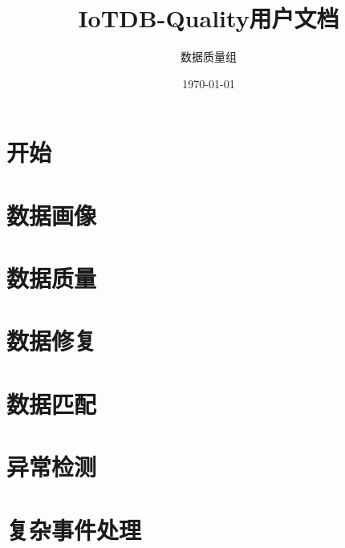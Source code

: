 \documentclass[cn,11pt,mode=simple,table]{elegantbook}
\title{IoTDB-Quality用户文档}
\author{数据质量组}
\institute{清华大学软件学院}
\date{\today}
\begin{document}
\maketitle
\tableofcontents
\mainmatter

\chapter{开始}




\chapter{数据画像}
















\chapter{数据质量}





\chapter{数据修复}




\chapter{数据匹配}




\chapter{异常检测}




\chapter{复杂事件处理}






\end{document}
